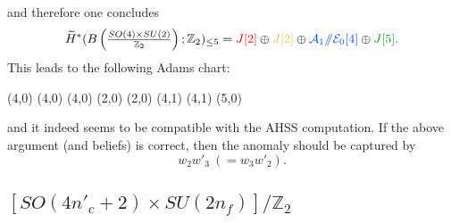 \documentclass[12pt]{article}
\numberwithin{equation}{section}
\newcommand*{\colorA}[1]{\textcolor{colorA}{#1}}
\newcommand*{\colorB}[1]{\textcolor{colorB}{#1}}
\newcommand*{\colorC}[1]{\textcolor{colorC}{#1}}
\newcommand*{\colorD}[1]{\textcolor{colorD}{#1}}
\let\tilde\widetilde
\def\bZ{\mathbb{Z}}
\begin{document}
and therefore one concludes
\begin{equation}
	\tilde H^\ast(B\left(\tfrac{SO(4)\times SU(2)}{\bZ_2}\right);\bZ_2)_{\leq 5} = \colorA{J[2]} \oplus \colorC{J[2]} \oplus \colorB{\mathcal{A}_1/\!\!/\mathcal{E}_0[4]} \oplus \colorD{J[5]}.
\end{equation}
This leads to the following Adams chart:
\begin{center}
	\begin{sseqdata}[
		name=M,
		Adams grading,
		classes = fill,
		xrange = {0}{5},
		yrange = {0}{3},
	]
		\tower[colorB](4,0)
		\class[white](4,0)
		\class[white](4,0)
		\class[colorA](2,0)
		\class[colorC](2,0)
		\tower[colorA](4,1)
		\tower[colorC](4,1)
		\class[colorD](5,0)
	\end{sseqdata}
	\printpage[name = M,page = 2]
\end{center}
and it indeed seems to be compatible with the AHSS computation.
If the above argument (and beliefs) is correct, then the anomaly should be captured by
\begin{equation}
	w_2w'_3\ (= w_3w'_2).
\end{equation}

\subsection{$[SO(4n'_c+2)\times SU(2n_f)]/\bZ_2$}
\label{sec:so(2odd)}
\end{document}

